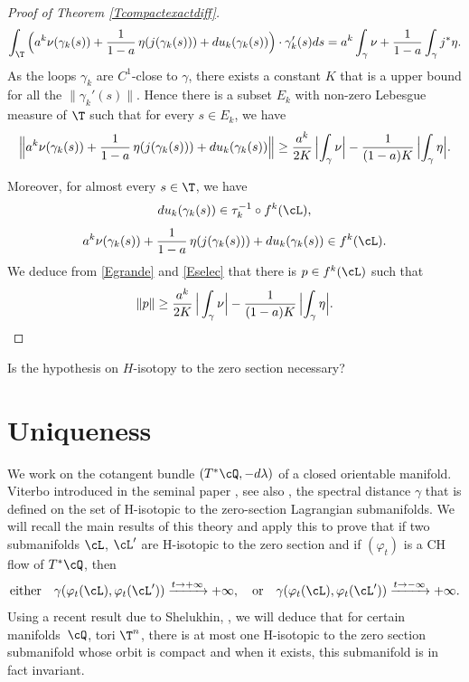 \begin{proof}[Proof of Theorem \ref{Tcompactexactdiff}]
\[
\int_\T \Big( a^k\nu(\gamma_k(s))+\frac{1}{1-a}\,\eta(j(\gamma_k(s)))+du_k(\gamma_k(s))\Big)\cdot \gamma_k'(s)ds=a^k\int_\gamma\nu+\frac{1}{1-a}\int_\gamma j^*\eta.
\]
As the loops $\gamma_k$ are $C^1$-close to $\gamma$, there exists a constant $K$ that is a upper bound for all the $\| \gamma_k'(s)\|$. Hence there is a subset $E_k$ with non-zero Lebesgue measure of $\T$ such that for every $s\in E_k$, we have
\begin{equation}\label{Egrande}
\Bigl\|a^k\nu(\gamma_k(s))+\frac{1}{1-a}\,\eta(j(\gamma_k(s)))+du_k(\gamma_k(s))\Bigr\|\geq \frac{a^k}{2K}\,\Bigl\vert\int_\gamma\nu\Bigr\vert-\frac{1}{(1-a)K}\,\Bigl\vert\int_\gamma\eta\Bigr\vert.\end{equation}

Moreover, for almost every $s\in\T$, we have
\[
du_k(\gamma_k(s))\in \tau_{k}^{-1}\circ f^k(\cL),
\]
\ie
\begin{equation}\label{Eselec}
a^k\nu(\gamma_k(s))+\frac{1}{1-a}\,\eta(j(\gamma_k(s)))+du_k(\gamma_k(s))\in f^k(\cL).
\end{equation}
We deduce from \eqref{Egrande} and \eqref{Eselec} that there is $p\in f^k(\cL)$ such that
\[
\| p\|\geq \frac{a^k}{2K}\,\Big\vert\int_\gamma\nu\Big\vert-\frac{1}{(1-a)K}\,\Bigl\vert\int_\gamma\eta\Bigr\vert.\qedhere
\]
\end{proof}

\begin{question*}
Is the hypothesis on $H$-isotopy to the zero section necessary?
\end{question*}

\section{Uniqueness}\label{Suniqueness}

We work on the cotangent bundle $(T^*\cQ, -d\lambda)$ of a closed orientable manifold.
Viterbo introduced in the seminal paper \cite{Vit1992}, see also \cite{Vit2008}, the spectral distance $\gamma$ that is defined on the set of H-isotopic to the zero-section Lagrangian submanifolds.
We will recall the main results of this theory and apply this to prove that if two submanifolds $\cL$, $\cL'$ are H-isotopic to the zero section and if $(\varphi_t)$ is a CH flow of $T^*\cQ$, then
\[
\text{either}\quad\gamma (\varphi_t(\cL), \varphi_t(\cL'))\xrightarrow[]{t\to +\infty}+\infty,\quad\text{or}\quad\gamma (\varphi_t(\cL), \varphi_t(\cL'))\xrightarrow[]{t\to -\infty}+\infty.
\]
Using a recent result due to Shelukhin, \cite{Shel2020}, we will deduce that for certain manifolds~$\cQ$, \eg tori $\T^n$, there is at most one H-isotopic to the zero section submanifold whose orbit is compact and when it exists, this submanifold is in fact invariant.

